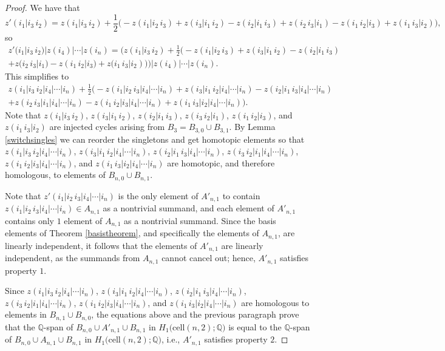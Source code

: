 \documentclass[12py]{amsart}%
\theoremstyle{definition}\newtheorem{definition}[thm]{Definition}
\theoremstyle{definition}
\newcommand{\Q}{\ensuremath{\mathbb{Q}}}
\begin{document}
\begin{proof}
We have that
\[
z'(i_{1}|i_{3}\,i_{2})=z(i_{1}|i_{3}\,i_{2})+\frac{1}{2}\big(-z(i_{1}|i_{2}\,i_{3})+z(i_{3}|i_{1}\,i_{2})-z(i_{2}|i_{1}\,i_{3})+z(i_{2}\,i_{3}|i_{1})-z(i_{1}\,i_{2}|i_{3})+z(i_{1}\,i_{3}|i_{2})\big),
\]
so
\begin{multline*}
z'(i_{1}|i_{3}\,i_{2})|z(i_{4})|\cdots|z(i_{n})=\Big(z(i_{1}|i_{3}\,i_{2})+\frac{1}{2}\big(-z(i_{1}|i_{2}\,i_{3})+z(i_{3}|i_{1}\,i_{2})-z(i_{2}|i_{1}\,i_{3})\\
+z(i_{2}\,i_{3}|i_{1})-z(i_{1}\,i_{2}|i_{3})+z(i_{1}\,i_{3}|i_{2})\big)\Big)|z(i_{4})|\cdots|z(i_{n}).
\end{multline*}
This simplifies to
\begin{multline*}
z(i_{1}|i_{3}\,i_{2}|i_{4}|\cdots|i_{n})+\frac{1}{2}\Big(-z(i_{1}|i_{2}\,i_{3}|i_{4}|\cdots|i_{n})+z(i_{3}|i_{1}\,i_{2}|i_{4}|\cdots|i_{n})
-z(i_{2}|i_{1}\,i_{3}|i_{4}|\cdots|i_{n})\\
+z(i_{2}\,i_{3}|i_{1}|i_{4}|\cdots|i_{n})-z(i_{1}\,i_{2}|i_{3}|i_{4}|\cdots|i_{n})+z(i_{1}\,i_{3}|i_{2}|i_{4}|\cdots|i_{n})\Big).
\end{multline*}
Note that $z(i_{1}|i_{3}\,i_{2})$, $z(i_{3}|i_{1}\,i_{2})$, $z(i_{2}|i_{1}\,i_{3})$, $z(i_{3}\,i_{2}|i_{1})$, $z(i_{1}\,i_{2}|i_{3})$, and $z(i_{1}\,i_{3}|i_{2})$ are injected cycles arising from $B_{3}=B_{3,0}\cup B_{3,1}$. By Lemma \ref{switchsingles} we can reorder the singletons and get homotopic elements so that $z(i_{1}|i_{3}\,i_{2}|i_{4}|\cdots|i_{n})$, $z(i_{3}|i_{1}\,i_{2}|i_{4}|\cdots|i_{n})$, $z(i_{2}|i_{1}\,i_{3}|i_{4}|\cdots|i_{n})$, $z(i_{3}\,i_{2}|i_{1}|i_{4}|\cdots|i_{n})$, $z(i_{1}\,i_{2}|i_{3}|i_{4}|\cdots|i_{n})$, and $z(i_{1}\,i_{3}|i_{2}|i_{4}|\cdots|i_{n})$ are homotopic, and therefore homologous, to elements of $B_{n,0}\cup B_{n,1}$.

Note that $z'(i_{1}|i_{2}\,i_{3}|i_{4}|\cdots|i_{n})$ is the only element of $A'_{n,1}$ to contain $z(i_{1}|i_{2}\,i_{3}|i_{4}|\cdots|i_{n})\in A_{n,1}$ as a nontrivial summand, and each element of $A'_{n,1}$ contains only $1$ element of $A_{n,1}$ as a nontrivial summand. Since the basis elements of Theorem \ref{basistheorem}, and specifically the elements of $A_{n,1}$, are linearly independent, it follows that the elements of $A'_{n,1}$ are linearly independent, as the summands from $A_{n,1}$ cannot cancel out; hence, $A'_{n,1}$ satisfies property $1$. 

Since $z(i_{1}|i_{3}\,i_{2}|i_{4}|\cdots|i_{n})$, $z(i_{3}|i_{1}\,i_{2}|i_{4}|\cdots|i_{n})$, $z(i_{2}|i_{1}\,i_{3}|i_{4}|\cdots|i_{n})$, $z(i_{3}\,i_{2}|i_{1}|i_{4}|\cdots|i_{n})$, $z(i_{1}\,i_{2}|i_{3}|i_{4}|\cdots|i_{n})$, and $z(i_{1}\,i_{3}|i_{2}|i_{4}|\cdots|i_{n})$ are homologous to elements in $B_{n,1}\cup B_{n,0}$, the equations above and the previous paragraph prove that the $\Q$-span of $B_{n,0}\cup A'_{n,1}\cup B_{n,1}$ in $H_{1}\big(\text{cell}(n,2);\Q\big)$ is equal to the $\Q$-span of $B_{n,0}\cup A_{n,1}\cup B_{n,1}$ in $H_{1}\big(\text{cell}(n,2);\Q\big)$, i.e., $A'_{n,1}$ satisfies property $2$.


\end{proof}
\end{document}
